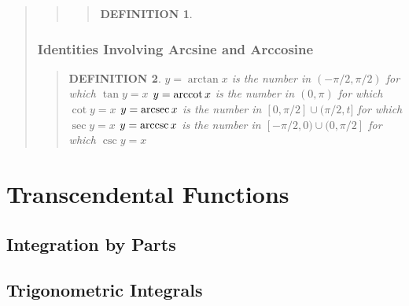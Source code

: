 \documentclass{report}
\newtheorem*{definition}{DEFINITION}
\begin{document}
\begin{quote}
\begin{quote}
\begin{quote}
\begin{definition}
		\end{definition}
		\end{quote}

	\end{quote}

	\subsection{Identities Involving Arcsine and Arccosine	}
	\begin{quote}

		\begin{definition}
			$y = \arctan x$ is the number in $(-\pi/2,\pi/2)$ for which $\tan y = x$
			$y = \arccot x$ is the number in $(0,\pi)$ for which $\cot y = x$
			$y = \arcsec x$ is the number in $[0, \pi/2] \cup (\pi / 2,t]$ for which $\sec y = x$
			$y = \arccsc x$ is the number in $[-\pi/2,0) \cup (0,\pi/2]$ for which $\csc y = x$
		\end{definition}
		
	\end{quote}

\end{quote}


\chapter{Transcendental  Functions}
\setcounter{section}{1}


\section{Integration by Parts}
\begin{quote}

\end{quote}


\section{Trigonometric Integrals}
\begin{quote}

\end{quote}
\end{document}
